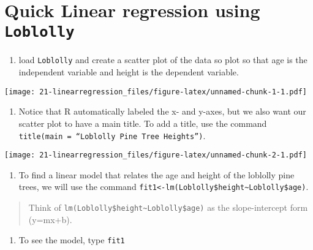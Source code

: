 \documentclass[
]{book}
\newenvironment{Shaded}{\begin{snugshade}}{\end{snugshade}}
\newcommand{\CommentTok}[1]{\textcolor[rgb]{0.56,0.35,0.01}{\textit{#1}}}
\newcommand{\FunctionTok}[1]{\textcolor[rgb]{0.00,0.00,0.00}{#1}}
\newcommand{\NormalTok}[1]{#1}
\newcommand{\OtherTok}[1]{\textcolor[rgb]{0.56,0.35,0.01}{#1}}
\newcommand{\SpecialCharTok}[1]{\textcolor[rgb]{0.00,0.00,0.00}{#1}}
\providecommand{\tightlist}{%
  \setlength{\itemsep}{0pt}\setlength{\parskip}{0pt}}
\begin{document}
\hypertarget{quick-linear-regression-using-loblolly}{%
\section{\texorpdfstring{Quick Linear regression using \texttt{Loblolly}}{Quick Linear regression using Loblolly}}\label{quick-linear-regression-using-loblolly}}

\begin{enumerate}
\def\labelenumi{\arabic{enumi}.}
\tightlist
\item
  load \texttt{Loblolly} and create a scatter plot of the data so plot so that age is the independent variable and height is the
  dependent variable.
\end{enumerate}

\texttt{[image: 21-linearregression\_files/figure-latex/unnamed-chunk-1-1.pdf]}

\begin{enumerate}
\def\labelenumi{\arabic{enumi}.}
\setcounter{enumi}{1}
\tightlist
\item
  Notice that R automatically labeled the x- and y-axes, but we also want our scatter plot to
  have a main title. To add a title, use the command \texttt{title(main\ =\ “Loblolly\ Pine\ Tree\ Heights”)}.
\end{enumerate}

\texttt{[image: 21-linearregression\_files/figure-latex/unnamed-chunk-2-1.pdf]}

\begin{enumerate}
\def\labelenumi{\arabic{enumi}.}
\setcounter{enumi}{2}
\tightlist
\item
  To find a linear model that relates the age and height of the loblolly pine trees, we will use the
  command \texttt{fit1\textless{}-lm(Loblolly\$height\textasciitilde{}Loblolly\$age)}.
\end{enumerate}

\begin{quote}
Think of \texttt{lm(Loblolly\$height\textasciitilde{}Loblolly\$age)} as the slope-intercept form (y=mx+b).
\end{quote}

\begin{enumerate}
\def\labelenumi{\arabic{enumi}.}
\setcounter{enumi}{3}
\tightlist
\item
  To see the model, type \texttt{fit1}
\end{enumerate}

\begin{Shaded}
\end{Shaded}
\end{document}
